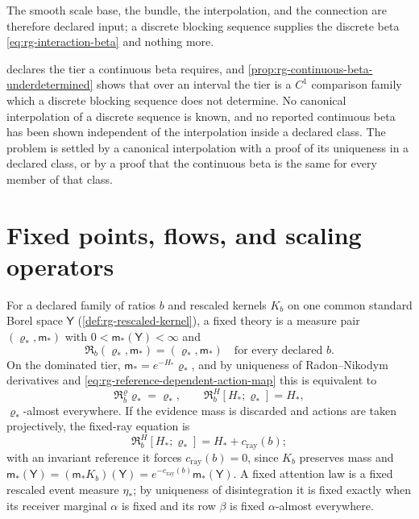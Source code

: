 The smooth scale base, the bundle, the interpolation, and the connection are
therefore declared input; a discrete blocking sequence supplies the discrete
beta \eqref{eq:rg-interaction-beta} and nothing more.

 declares the tier a continuous beta requires,
and \cref{prop:rg-continuous-beta-underdetermined} shows that over an interval
the tier is a \(C^1\) comparison family which a discrete blocking sequence does
not determine. No canonical interpolation of a discrete sequence is known, and
no reported continuous beta has been shown independent of the interpolation
inside a declared class. The problem is settled by a canonical interpolation
with a proof of its uniqueness in a declared class, or by a proof that the
continuous beta is the same for every member of that class.

\section{Fixed points, flows, and scaling operators}
\label{sec:rg-fixed-points}

For a declared family of ratios \(b\) and rescaled kernels \(K_b\) on one
common standard Borel space \(\mathsf Y\) (\cref{def:rg-rescaled-kernel}), a
fixed theory is a measure pair \((\varrho_*,\mathsf m_*)\) with
\(0<\mathsf m_*(\mathsf Y)<\infty\) and
\begin{equation}
\mathfrak R_b(\varrho_*,\mathsf m_*)=(\varrho_*,\mathsf m_*)
\quad\text{for every declared }b.
\label{eq:rg-fixed-measure-pair}
\end{equation}
On the dominated tier, \(\mathsf m_*=e^{-H_*}\varrho_*\), and by uniqueness of
Radon--Nikodym derivatives and \eqref{eq:rg-reference-dependent-action-map} this
is equivalent to
\begin{equation}
\mathfrak R^\varrho_b\varrho_*=\varrho_*,
\qquad
\mathfrak R^H_b[H_*;\varrho_*]=H_*,
\label{eq:rg-fixed-action}
\end{equation}
\(\varrho_*\)-almost everywhere. If the evidence mass is discarded and actions are
taken projectively, the fixed-ray equation is
\begin{equation}
\mathfrak R^H_b[H_*;\varrho_*]=H_*+c_{\mathrm{ray}}(b);
\label{eq:rg-fixed-action-ray}
\end{equation}
with an invariant reference it forces \(c_{\mathrm{ray}}(b)=0\), since \(K_b\)
preserves mass and
\(\mathsf m_*(\mathsf Y)=(\mathsf m_*K_b)(\mathsf Y)=e^{-c_{\mathrm{ray}}(b)}\mathsf m_*(\mathsf Y)\). A
fixed attention law is a fixed rescaled event measure \(\eta_*\); by uniqueness
of disintegration it is fixed exactly when its receiver marginal \(\alpha\) is
fixed and its row \(\beta\) is fixed \(\alpha\)-almost everywhere.

